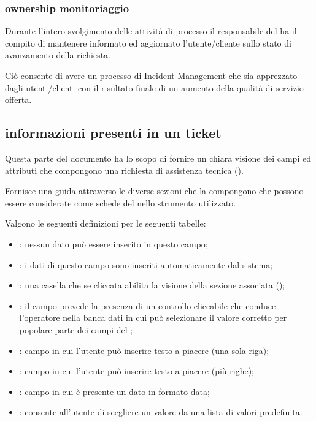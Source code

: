 \subsubsection[Ownership Monitoraggio]{ownership monitoriaggio}
Durante l'intero svolgimento delle attività di processo il responsabile del  ha il compito di mantenere informato ed aggiornato l'utente/cliente sullo stato di avanzamento della richiesta.

Ciò consente di avere un processo di \ac{Incident-Management} che sia apprezzato dagli utenti/clienti con il risultato finale di un aumento della qualità di servizio offerta.

\subsection[Informazioni presenti in un ticket]{informazioni presenti in un ticket}
\label{prc-incident-ticket}
Questa parte del documento ha lo scopo di fornire un chiara visione dei campi ed attributi che compongono una richiesta di assistenza tecnica ().

Fornisce una guida attraverso le diverse sezioni che la compongono che possono essere considerate come schede del  nello strumento utilizzato.

Valgono le seguenti definizioni per le seguenti tabelle:

\begin{itemize}
\item{: nessun dato può essere inserito in questo campo;}
\item{: i dati di questo campo sono inseriti automaticamente dal sistema;}
\item{: una casella che se cliccata abilita la visione della sezione associata ();}
\item{: il campo prevede la presenza di un controllo cliccabile che conduce l'operatore nella banca dati in cui può selezionare il valore corretto per popolare parte dei campi del ;}
\item{: campo in cui l'utente può inserire testo a piacere (una sola riga);}
\item{: campo in cui l'utente può inserire testo a piacere (più righe);}
\item{: campo in cui è presente un dato in formato data;}
\item{: consente all'utente di scegliere un valore da una lista di valori predefinita.}
\end{itemize}

